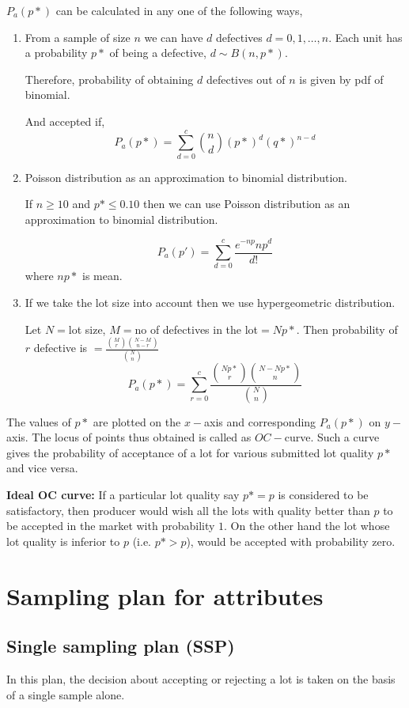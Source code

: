 \documentclass[oneside,11pt,pdftex]{book}%
\numberwithin{equation}{section}
\numberwithin{section}{chapter}
\numberwithin{equation}{chapter}
\begin{document}
$ P_a(p*) $ can be calculated in any one of the following ways,
\begin{enumerate}
	\item From a sample of size $ n $ we can have $ d $ defectives $ d=0,1,\dots,n $. Each unit has a probability $ p* $ of being a defective, $ d \sim B(n,p*) $.
	
	Therefore, probability of obtaining $ d $ defectives out of $ n $ is given by pdf of binomial.
	
	And accepted if,
	\[P_a(p*)=\sum_{d=0}^c \binom{n}{d}(p*)^d (q*)^{n-d} \]
	
	\item Poisson distribution as an approximation to binomial distribution.
	
	If $ n\geq 10 $ and $ p* \leq 0.10 $ then we can use Poisson distribution as an approximation to binomial distribution.
	
	\[ P_a(p') = \sum_{d=0}^c \frac{e^{-np}np^d}{d!}\] where $ np* $ is mean.
	\item If we take the lot size into account then we use hypergeometric distribution.
	
	Let $ N= $lot size, $ M= $no of defectives in the lot$ =Np* $.
	Then probability of $ r $ defective is $ =\frac{\binom{M}{r}\binom{N-M}{n-r}}{\binom{N}{n}} $
	\[ P_a(p*)= \sum_{r=0}^c \frac{\binom{Np*}{r}\binom{N-Np*}{n}}{\binom{N}{n}}\]
\end{enumerate}

The values of $ p* $ are plotted on the $ x- $axis and corresponding $ P_a(p*) $ on $ y- $axis. The locus of points thus obtained is called as $ OC-$curve. Such a curve gives the probability of acceptance of a lot for various submitted lot quality $ p* $ and vice versa.

\textbf{Ideal OC curve:} If a particular lot quality say $ p*=p $ is considered to be satisfactory, then producer would wish all the lots with quality better than $ p $ to be accepted in the market with probability $ 1 $. On the other hand the lot whose lot quality is inferior to $ p $ (i.e. $ p*>p $), would be accepted with probability zero.

\section{Sampling plan for attributes}
\subsection{Single sampling plan (SSP)}
In this plan, the decision about accepting or rejecting a lot is taken on the basis of a single sample alone.
\end{document}
